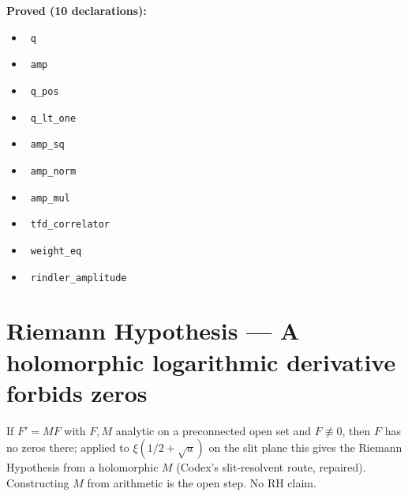 \documentclass{report}
\theoremstyle{definition}
\begin{document}
\noindent\textbf{Proved (10 declarations):}
\begin{itemize}
  \item {}\leanok\ \texttt{q}
  \item {}\leanok\ \texttt{amp}
  \item {}\leanok\ \texttt{q\_pos}
  \item {}\leanok\ \texttt{q\_lt\_one}
  \item {}\leanok\ \texttt{amp\_sq}
  \item {}\leanok\ \texttt{amp\_norm}
  \item {}\leanok\ \texttt{amp\_mul}
  \item {}\leanok\ \texttt{tfd\_correlator}
  \item {}\leanok\ \texttt{weight\_eq}
  \item {}\leanok\ \texttt{rindler\_amplitude}
\end{itemize}

\section{Riemann Hypothesis --- A holomorphic logarithmic derivative forbids zeros}
If $F'=MF$ with $F,M$ analytic on a preconnected open set and $F\not\equiv0$, then $F$ has no zeros there; applied to $\xi(1/2+\sqrt u)$ on the slit plane this gives the Riemann Hypothesis from a holomorphic $M$ (Codex's slit-resolvent route, repaired). Constructing $M$ from arithmetic is the open step. No RH claim.
\end{document}
